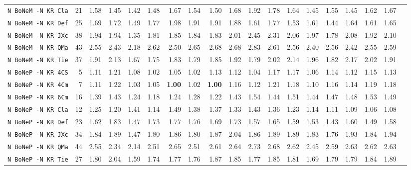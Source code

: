 \begin{tabular}{l | r @{~~} r | r@{~~}r@{~~}r@{~~}r@{~~}r@{~~}r@{~~}r@{~~}r@{~~}r@{~~}r@{~~}r@{~~}r@{~~}r@{~~}r@{~~}r@{~~}r|}
\verb+N BoNeM -N KR Cla+ & 21 & 1.58 & 1.45&1.42&1.48&1.67&1.54&1.50&1.68&1.92&1.78&1.64&1.45&1.55&1.45&1.62&1.67\\
\verb+N BoNeM -N KR Def+ & 25 & 1.69 & 1.72&1.49&1.77&1.98&1.91&1.91&1.88&1.61&1.77&1.53&1.61&1.44&1.64&1.61&1.65\\
\verb+N BoNeM -N KR JXc+ & 38 & 1.94 & 1.94&1.35&1.81&1.85&1.84&1.83&2.01&2.45&2.31&2.06&1.97&1.78&2.08&1.92&2.10\\
\verb+N BoNeM -N KR QMa+ & 43 & 2.55 & 2.43&2.18&2.62&2.50&2.65&2.68&2.68&2.83&2.61&2.56&2.40&2.56&2.42&2.55&2.59\\
\verb+N BoNeM -N KR Tie+ & 37 & 1.91 & 2.13&1.67&1.75&1.83&1.79&1.85&1.92&1.79&2.02&2.14&1.96&1.82&2.17&2.02&1.91\\
\verb+N BoNeP -N KR 4CS+ & 5 & 1.11 & 1.21&1.08&1.02&1.05&1.02&1.13&1.12&1.04&1.17&1.17&1.06&1.14&1.12&1.15&1.13\\
\verb+N BoNeP -N KR 4Cm+ & 7 & 1.11 & 1.22&1.03&1.05&\textbf{1.00}&1.02&\textbf{1.00}&1.16&1.12&1.21&1.18&1.10&1.16&1.14&1.19&1.18\\
\verb+N BoNeP -N KR 6Cm+ & 16 & 1.39 & 1.43&1.24&1.18&1.24&1.28&1.22&1.43&1.54&1.44&1.51&1.44&1.47&1.48&1.53&1.49\\
\verb+N BoNeP -N KR Cla+ & 12 & 1.25 & 1.20&1.41&1.14&1.49&1.38&1.37&1.33&1.43&1.36&1.23&1.14&1.11&1.09&1.06&1.08\\
\verb+N BoNeP -N KR Def+ & 23 & 1.62 & 1.83&1.47&1.73&1.77&1.76&1.69&1.73&1.57&1.65&1.59&1.53&1.43&1.60&1.49&1.58\\
\verb+N BoNeP -N KR JXc+ & 34 & 1.84 & 1.89&1.47&1.80&1.86&1.80&1.87&2.04&1.86&1.89&1.89&1.83&1.76&1.93&1.84&1.94\\
\verb+N BoNeP -N KR QMa+ & 44 & 2.55 & 2.34&2.14&2.51&2.65&2.51&2.61&2.64&2.73&2.68&2.62&2.45&2.59&2.63&2.62&2.63\\
\verb+N BoNeP -N KR Tie+ & 27 & 1.80 & 2.04&1.59&1.74&1.77&1.76&1.87&1.85&1.77&1.85&1.81&1.69&1.79&1.79&1.84&1.89\\
\end{tabular}
